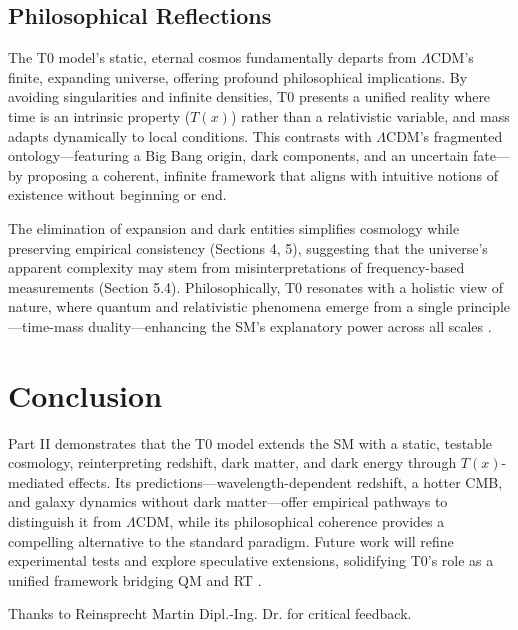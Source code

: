 \documentclass[twocolumn,aps,prl]{revtex4-2}
\newcommand{\Tfield}{T(x)}
\begin{document}
	\subsection{Philosophical Reflections}
	\label{subsec:philosophical_reflections}
	
	The T0 model’s static, eternal cosmos fundamentally departs from \(\Lambda\)CDM’s finite, expanding universe, offering profound philosophical implications. By avoiding singularities and infinite densities, T0 presents a unified reality where time is an intrinsic property (\(\Tfield\)) rather than a relativistic variable, and mass adapts dynamically to local conditions. This contrasts with \(\Lambda\)CDM’s fragmented ontology—featuring a Big Bang origin, dark components, and an uncertain fate—by proposing a coherent, infinite framework that aligns with intuitive notions of existence without beginning or end.
	
	The elimination of expansion and dark entities simplifies cosmology while preserving empirical consistency (Sections 4, 5), suggesting that the universe’s apparent complexity may stem from misinterpretations of frequency-based measurements (Section 5.4). Philosophically, T0 resonates with a holistic view of nature, where quantum and relativistic phenomena emerge from a single principle—time-mass duality—enhancing the SM’s explanatory power across all scales \cite{pascher_perspective_2025}.
	
	\section{Conclusion}
	\label{sec:conclusion}
	
	Part II demonstrates that the T0 model extends the SM with a static, testable cosmology, reinterpreting redshift, dark matter, and dark energy through \(\Tfield\)-mediated effects. Its predictions—wavelength-dependent redshift, a hotter CMB, and galaxy dynamics without dark matter—offer empirical pathways to distinguish it from \(\Lambda\)CDM, while its philosophical coherence provides a compelling alternative to the standard paradigm. Future work will refine experimental tests and explore speculative extensions, solidifying T0’s role as a unified framework bridging QM and RT \cite{pascher_perspective_2025}.
	
	\begin{acknowledgments}
		Thanks to Reinsprecht Martin Dipl.-Ing. Dr. for critical feedback.
	\end{acknowledgments}
	
\end{document}
